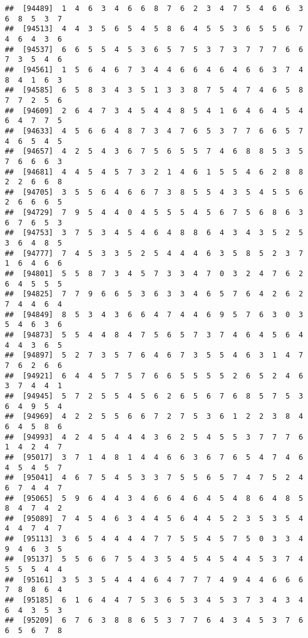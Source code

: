\documentclass[
]{book}
\begin{document}
\begin{verbatim}
##  [94489]  1  4  6  3  4  6  6  8  7  6  2  3  4  7  5  4  6  6  3  6  8  5  3  7
##  [94513]  4  4  3  5  6  5  4  5  8  6  4  5  5  3  6  5  5  6  7  4  6  4  3  6
##  [94537]  6  6  5  5  4  5  3  6  5  7  5  3  7  3  7  7  7  6  6  7  3  5  4  6
##  [94561]  1  5  6  4  6  7  3  4  4  6  6  4  6  4  6  6  3  7  4  8  4  1  6  3
##  [94585]  6  5  8  3  4  3  5  1  3  3  8  7  5  4  7  4  6  5  8  7  7  2  5  6
##  [94609]  2  6  4  7  3  4  5  4  4  8  5  4  1  6  4  6  4  5  4  6  4  7  7  5
##  [94633]  4  5  6  6  4  8  7  3  4  7  6  5  3  7  7  6  6  5  7  4  6  5  4  5
##  [94657]  4  2  5  4  3  6  7  5  6  5  5  7  4  6  8  8  5  3  5  7  6  6  6  3
##  [94681]  4  4  5  4  5  7  3  2  1  4  6  1  5  5  4  6  2  8  8  2  2  6  6  8
##  [94705]  3  5  5  6  4  6  6  7  3  8  5  5  4  3  5  4  5  5  6  2  6  6  6  5
##  [94729]  7  9  5  4  4  0  4  5  5  5  4  5  6  7  5  6  8  6  3  6  7  6  5  3
##  [94753]  3  7  5  3  4  5  4  6  4  8  8  6  4  3  4  3  5  2  5  3  6  4  8  5
##  [94777]  7  4  5  3  3  5  2  5  4  4  4  6  3  5  8  5  2  3  7  1  6  4  6  6
##  [94801]  5  5  8  7  3  4  5  7  3  3  4  7  0  3  2  4  7  6  2  6  4  5  5  5
##  [94825]  7  7  9  6  6  5  3  6  3  3  4  6  5  7  6  4  2  6  2  7  4  4  6  4
##  [94849]  8  5  3  4  3  6  6  4  7  4  4  6  9  5  7  6  3  0  3  5  4  6  3  6
##  [94873]  5  5  4  4  8  4  7  5  6  5  7  3  7  4  6  4  5  6  4  4  4  3  6  5
##  [94897]  5  2  7  3  5  7  6  4  6  7  3  5  5  4  6  3  1  4  7  7  6  2  6  6
##  [94921]  6  4  4  5  7  5  7  6  6  5  5  5  5  2  6  5  2  4  6  3  7  4  4  1
##  [94945]  5  7  2  5  5  4  5  6  2  6  5  6  7  6  8  5  7  5  3  6  4  9  5  4
##  [94969]  4  2  2  5  5  6  6  7  2  7  5  3  6  1  2  2  3  8  4  6  4  5  8  6
##  [94993]  4  2  4  5  4  4  4  3  6  2  5  4  5  5  3  7  7  7  6  1  4  2  4  7
##  [95017]  3  7  1  4  8  1  4  4  6  6  3  6  7  6  5  4  7  4  6  4  5  4  5  7
##  [95041]  4  6  7  5  4  5  3  3  7  5  5  6  5  7  4  7  5  2  4  6  7  4  4  7
##  [95065]  5  9  6  4  4  3  4  6  6  4  6  4  5  4  8  6  4  8  5  8  4  7  4  2
##  [95089]  7  4  5  4  6  3  4  4  5  6  4  4  5  2  3  5  3  5  4  4  4  7  4  7
##  [95113]  3  6  5  4  4  4  4  7  7  5  5  4  5  7  5  0  3  3  4  9  4  6  3  5
##  [95137]  5  5  6  6  7  5  4  3  5  4  5  4  5  4  4  5  3  7  4  5  5  5  4  4
##  [95161]  3  5  3  5  4  4  4  6  4  7  7  7  4  9  4  4  6  6  6  7  8  8  6  4
##  [95185]  6  1  6  4  4  7  5  3  6  5  3  4  5  3  7  3  4  3  4  6  4  3  5  3
##  [95209]  6  7  6  3  8  8  6  5  3  7  7  6  4  3  4  5  3  7  6  6  5  6  7  8

\end{verbatim}
\end{document}
